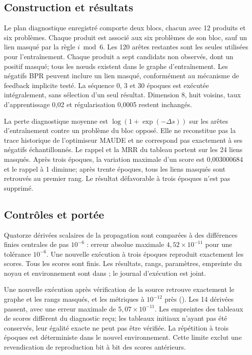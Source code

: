 \subsection{Construction et résultats}
Le plan diagnostique enregistré comporte deux blocs, chacun avec 12 produits et six problèmes. Chaque produit est associé aux six problèmes de son bloc, sauf un lien masqué par la règle $i\bmod6$. Les 120 arêtes restantes sont les seules utilisées pour l'entraînement. Chaque produit a sept candidats non observés, dont un positif masqué; tous les nœuds existent dans le graphe d'entraînement. Les négatifs BPR peuvent inclure un lien masqué, conformément au mécanisme de feedback implicite testé. La séquence 0, 3 et 30 époques est exécutée intégralement, sans sélection d'un seul résultat. Dimension 8, huit voisins, taux d'apprentissage 0,02 et régularisation 0,0005 restent inchangés.

\begin{table}[!htbp]\centering\small
\caption{Diagnostic synthétique du noyau extrait. Les métriques ne concernent pas MAUDE.}

\end{table}

La perte diagnostique moyenne est $\log(1+\exp(-\Delta s))$ sur les arêtes d'entraînement contre un problème du bloc opposé. Elle ne reconstitue pas la trace historique de l'optimiseur MAUDE et ne correspond pas exactement à ses négatifs échantillonnés. Le rappel et la MRR du tableau portent sur les 24 liens masqués. Après trois époques, la variation maximale d'un score est 0,003000684 et le rappel à 1 diminue; après trente époques, tous les liens masqués sont retrouvés au premier rang. Le résultat défavorable à trois époques n'est pas supprimé.

\subsection{Contrôles et portée}
Quatorze dérivées scalaires de la propagation sont comparées à des différences finies centrales de pas $10^{-6}$ : erreur absolue maximale $4,52\times10^{-11}$ pour une tolérance $10^{-6}$. Une nouvelle exécution à trois époques reproduit exactement les scores. Tous les scores sont finis. Les résultats, rangs, paramètres, empreinte du noyau et environnement sont dans ; le journal d'exécution est joint.

Une nouvelle exécution après vérification de la source retrouve exactement le graphe et les rangs masqués, et les métriques à $10^{-12}$ près (). Les 14 dérivées passent, avec une erreur maximale de $5,07\times10^{-11}$. Les empreintes des tableaux de scores diffèrent du diagnostic reçu; les tableaux initiaux n'ayant pas été conservés, leur égalité exacte ne peut pas être vérifiée. La répétition à trois époques est déterministe dans le nouvel environnement. Cette limite exclut une revendication de reproduction bit à bit des scores antérieurs.

